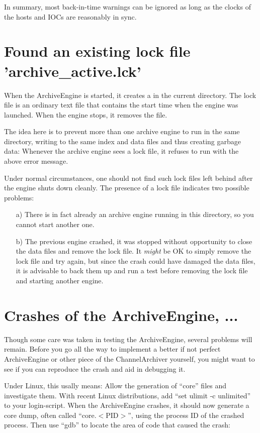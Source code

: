 \noindent In summary, most back-in-time warnings can be ignored as long as the
clocks of the hosts and IOCs are reasonably in sync.

\section{Found an existing lock file 'archive\_active.lck'}
When the ArchiveEngine is started, it creates a  in
the current directory. The lock file is an ordinary text file
that contains the start time when the engine was launched. When
the engine stops, it removes the file.

The idea here is to prevent more than one archive engine to run
in the same directory, writing to the same index and data files
and thus creating garbage data: Whenever the archive engine sees
a lock file, it refuses to run with the above error message.

Under normal circumstances, one should not find such lock files
left behind after the engine shuts down cleanly. The presence of
a lock file indicates two possible problems:
\begin{enumerate}
\item[a)] There is in fact already an archive engine running in
this directory, so you cannot start another one.
\item[b)] The previous engine crashed, it was stopped without
opportunity to close the data files and remove the lock file.
It \emph{might} be OK to simply remove the lock file and try
again, but since the crash could have damaged the data files, it
is advisable to back them up and run a test before removing the
lock file and starting another engine.
\end{enumerate}

\section{Crashes of the ArchiveEngine, ...} \label{sec:crash} 
Though some care was taken in testing the ArchiveEngine, several
problems will remain. Before you go all the way to implement a better
if not perfect ArchiveEngine or other piece of the ChannelArchiver
yourself, you might want to see if you can reproduce the crash and
aid in debugging it.

Under Linux, this usally means: Allow the generation of ``core'' files
and investigate them. With recent Linux distributions, add ``set
ulimit -c unlimited'' to your login-script. When the ArchiveEngine
crashes, it should now generate a core dump, often called
``core.$<$PID$>$'', using the process ID of the crashed process. Then use
``gdb'' to locate the area of code that caused the crash:

